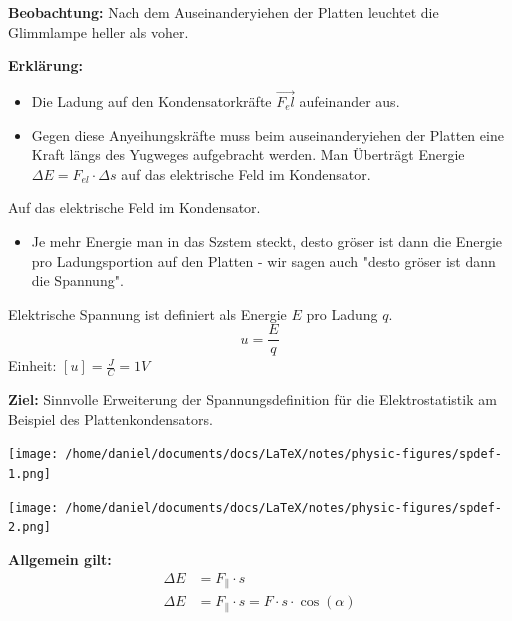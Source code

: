 \documentclass{report}
\begin{document}
\textbf{Beobachtung:} Nach dem Auseinanderyiehen der Platten leuchtet die Glimmlampe heller als voher.

\textbf{Erkl\"arung:} 
\begin{itemize}
  \item Die Ladung auf den Kondensatorkr\"afte $\vec{F_el}$ aufeinander aus.
  \item Gegen diese Anyeihungskr\"afte muss beim auseinanderyiehen der Platten eine Kraft l\"angs des Yugweges aufgebracht werden. Man \"Ubertr\"agt Energie $\Delta E= F_{el}\cdot 
    \Delta s$ auf das elektrische Feld im Kondensator.
\end{itemize}

Auf das elektrische Feld im Kondensator.
\begin{itemize}
  \item Je mehr Energie man in das Szstem steckt, desto gr\"oser ist dann die
    Energie pro Ladungsportion auf den Platten - wir sagen auch "desto gr\"oser
    ist dann die Spannung".
\end{itemize}

\begin{tcolorbox}[colback=red!10!white,colframe=red!75!black]
Elektrische Spannung ist definiert als Energie $E$ pro Ladung $q$.\\
\[u=\frac{E}{q}\]
Einheit: $[u]=\frac{J}{C}=1V$
\end{tcolorbox}

\textbf{Ziel:} Sinnvolle Erweiterung der Spannungsdefinition f\"ur die Elektrostatistik am Beispiel des Plattenkondensators.


\begin{center}
\begin{minipage}[t]{0.45\textwidth}
\centering
\texttt{[image: /home/daniel/documents/docs/LaTeX/notes/physic-figures/spdef-1.png]}
\end{minipage}\hfill

\begin{minipage}[t]{0.45\textwidth}
\centering
\texttt{[image: /home/daniel/documents/docs/LaTeX/notes/physic-figures/spdef-2.png]}
\end{minipage}
\end{center}


\textbf{Allgemein gilt:} 
\begin{align*}
\Delta E&=F_{\parallel} \cdot s \\
\Delta E&=F_{\parallel} \cdot s = F \cdot s \cdot \cos(\alpha)
\end{align*}
\end{document}
